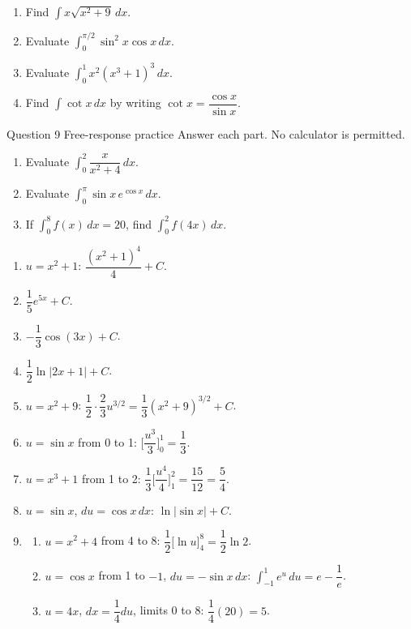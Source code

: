 \documentclass[11pt]{article}
\begin{document}
\begin{enumerate}[leftmargin=*,itemsep=2pt,start=5]
  \item Find $\displaystyle\int x\sqrt{x^2+9}\,dx$.\work{2.8cm}
  \item Evaluate $\displaystyle\int_{0}^{\pi/2}\sin^2x\cos x\,dx$.\work{2.8cm}
  \item Evaluate $\displaystyle\int_{0}^{1}x^2\left(x^3+1\right)^3\,dx$.\work{2.8cm}
  \item Find $\displaystyle\int\cot x\,dx$ by writing $\cot x=\dfrac{\cos x}{\sin x}$.\work{2.8cm}
\end{enumerate}

\begin{frbox}{Question 9 \textperiodcentered{} Free-response practice}
Answer each part. No calculator is permitted.
\begin{enumerate}[label=(\alph*),leftmargin=*,itemsep=2pt]
  \item Evaluate $\displaystyle\int_{0}^{2}\dfrac{x}{x^2+4}\,dx$.\work{2.6cm}
  \item Evaluate $\displaystyle\int_{0}^{\pi}\sin x\,e^{\cos x}\,dx$.\work{2.6cm}
  \item If $\displaystyle\int_{0}^{8}f(x)\,dx=20$, find $\displaystyle\int_{0}^{2}f(4x)\,dx$.\work{2.6cm}
\end{enumerate}
\end{frbox}

\newpage
\begin{solbox}
\begin{enumerate}[leftmargin=*,itemsep=4pt]
  \item $u=x^2+1$: $\dfrac{\left(x^2+1\right)^4}{4}+C$.
  \item $\dfrac15e^{5x}+C$.
  \item $-\dfrac13\cos(3x)+C$.
  \item $\dfrac12\ln|2x+1|+C$.
  \item $u=x^2+9$: $\dfrac12\cdot\dfrac23u^{3/2}=\dfrac13\left(x^2+9\right)^{3/2}+C$.
  \item $u=\sin x$ from 0 to 1: $\Big[\dfrac{u^3}{3}\Big]_0^1=\dfrac13$.
  \item $u=x^3+1$ from 1 to 2: $\dfrac13\Big[\dfrac{u^4}{4}\Big]_1^2=\dfrac{15}{12}=\dfrac54$.
  \item $u=\sin x$, $du=\cos x\,dx$: $\ln|\sin x|+C$.
  \item \begin{enumerate}[label=(\alph*),leftmargin=*,itemsep=3pt]
    \item $u=x^2+4$ from 4 to 8: $\dfrac12\Big[\ln u\Big]_4^8=\dfrac12\ln2$.
    \item $u=\cos x$ from 1 to $-1$, $du=-\sin x\,dx$: $\displaystyle\int_{-1}^{1}e^{u}\,du=e-\dfrac1e$.
    \item $u=4x$, $dx=\dfrac14du$, limits 0 to 8: $\dfrac14(20)=5$.
  \end{enumerate}
\end{enumerate}
\end{solbox}
\end{document}
